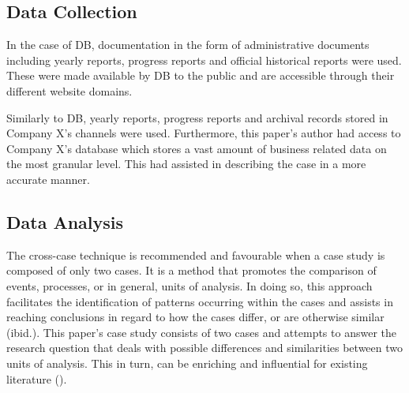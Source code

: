 \documentclass[11pt,a4paper]{article}
\begin{document}
{{\vspace{-2mm}

\subsection{Data Collection}
\label{data_collec}
\vspace{-1mm}
 \par
In the case of DB, documentation in the form of administrative documents including yearly reports, progress reports and official historical reports were used. These were made available by DB to the public and are accessible through their different website domains. \par
Similarly to DB, yearly reports, progress reports and archival records stored in Company X's channels were used. Furthermore, this paper's author had access to Company X's database which stores a vast amount of business related data on the most granular level. This had assisted in describing the case in a more accurate manner.
\vspace{-3mm}
\subsection{Data Analysis}
\label{data_ana}
\vspace{-1mm}
 \par
The cross-case technique is recommended and favourable when a case study is composed of only two cases. It is a method that promotes the comparison of events, processes, or in general, units of analysis. In doing so, this approach facilitates the identification of patterns occurring within the cases and assists in reaching conclusions in regard to how the cases differ, or are otherwise similar (ibid.). This paper's case study consists of two cases and attempts to answer the research question that deals with possible differences and similarities between two units of analysis. This in turn, can be enriching and influential for existing literature (\cite{gustafssonSingleCaseStudies2017}). \par

}}
\end{document}
